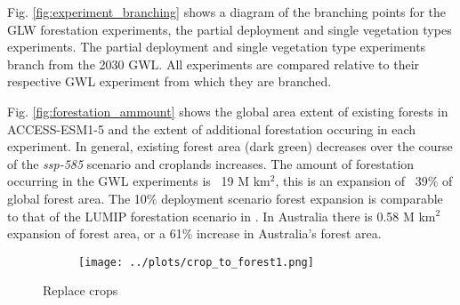 \documentclass[]{article}
\begin{document}
Fig. \ref{fig:experiment_branching} shows a diagram of the branching points for the GLW forestation experiments, the partial deployment and single vegetation types experiments.
The partial deployment and single vegetation type experiments branch from the 2030 GWL.
All experiments are compared relative to their respective GWL experiment from which they are branched.

Fig. \ref{fig:forestation_ammount} shows the global area extent of existing forests in ACCESS-ESM1-5 and the extent of additional forestation occuring in each experiment.
In general, existing forest area (dark green) decreases over the course of the \textit{ssp-585} scenario and croplands increases.
The amount of forestation occurring in the GWL experiments is ~19 M km$^2$, this is an expansion of ~39\% of global forest area.
The 10\% deployment scenario forest expansion is comparable to that of the LUMIP forestation scenario in \cite{loughran_limited_2023}.
In Australia there is 0.58 M km$^2$ expansion of forest area, or a 61\% increase in Australia's forest area.

\begin{figure}[H]
    \begin{subfigure}[b]{\linewidth}
        \centering
        \texttt{[image: ../plots/crop\_to\_forest1.png]}
    \end{subfigure}
    \caption{Replace crops}
    \label{fig:to_forest}
\end{figure}
\end{document}

